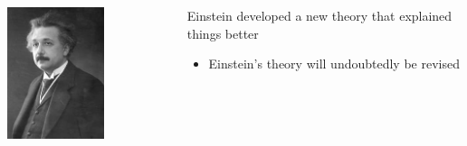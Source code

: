 \documentclass[10pt]{beamer}
\begin{document}
\begin{frame}[t]
	\vspace{0.25cm}

	\begin{columns}
		\begin{column}{0.3\textwidth}
			\begin{center}
				\includegraphics[width=0.6\textwidth]{figures/einstein.jpg}
			\end{center}
		\end{column}
		
		\begin{column}{0.7\textwidth}
			Einstein developed a new theory that explained things better
				\begin{itemize}
					\item \textcolor{myblue}{Einstein's theory will undoubtedly be revised}
				\end{itemize}
		\end{column}
	\end{columns}
\end{frame}
\end{document}
